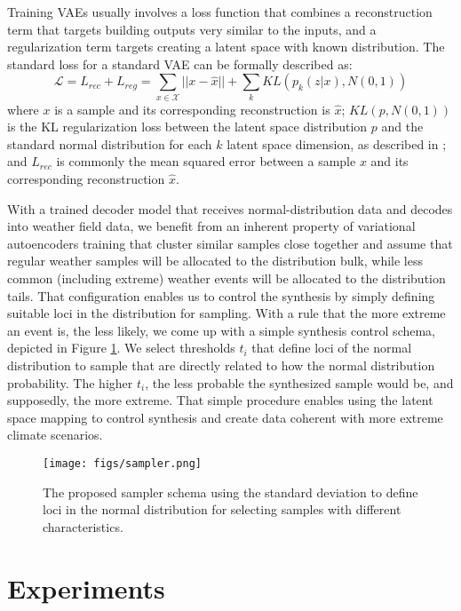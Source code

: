 \documentclass{article}
\begin{document}
Training VAEs usually involves a loss function that combines a reconstruction term that targets building outputs very similar to the inputs, and a regularization term targets creating a latent space with known distribution. The standard loss for a standard VAE \cite{vaes} can be formally described as: 
\noindent
\begin{equation}
    \mathcal{L} = L_{rec} + L_{reg} = \sum_{x\in\mathcal{X}} ||x - \hat{x}|| + \sum_{k}KL(p_k(z|x),N(0,1))
\end{equation}
\noindent
where $x$ is a sample and its corresponding reconstruction is $\hat{x}$;  $KL(p,N(0,1))$ is the KL regularization loss between the latent space distribution $p$ and the standard normal distribution for each $k$ latent space dimension, as described in \cite{vaes}; and $L_{rec}$ is commonly the mean squared error between a sample $x$ and its corresponding reconstruction $\hat{x}$.

With a trained decoder model that receives normal-distribution data and decodes into weather field data, we benefit from an inherent property of variational autoencoders training that cluster similar samples close together and assume that regular weather samples will be allocated to the distribution bulk, while less common (including extreme) weather events will be allocated to the distribution tails. That configuration enables us to control the synthesis by simply defining suitable loci in the distribution for sampling. With a rule that the more extreme an event is, the less likely, we come up with a simple synthesis control schema, depicted in Figure \ref{fig:sampler}. We select thresholds $t_i$ that define loci of the normal distribution to sample that are directly related to how the normal distribution probability. The higher $t_i$, the less probable the synthesized sample would be, and supposedly, the more extreme. That simple procedure enables using the latent space mapping to control synthesis and create data coherent with more extreme climate scenarios. 

\begin{figure}[h!]
	\centering
		\texttt{[image: figs/sampler.png]}
	\caption{The proposed sampler schema using the standard deviation to define loci in the normal distribution for selecting samples with different characteristics.}
	\label{fig:sampler}
\end{figure}

\section{Experiments}
\end{document}
